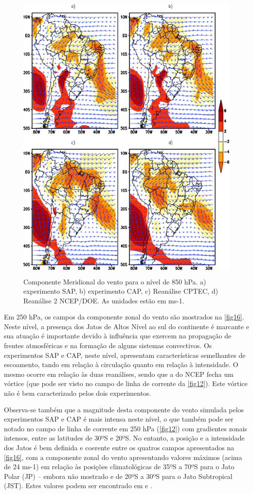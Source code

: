 \begin{figure}[!hbp]
\centering
\includegraphics[height=15cm]{./figs/media_vento-meridional_anl_850hPa.png}
\caption{Componente Meridional do vento para o nível de 850 hPa. a) experimento SAP, b) experimento CAP, c) Reanálise CPTEC, d) Reanálise 2 NCEP/DOE. As unidades estão em ms-1.}
\label{fig15}
\end{figure}

Em 250 hPa, os campos da componente zonal do vento são mostrados na \autoref{fig16}. Neste nível, a presença dos Jatos de Altos Nível ao sul do continente é marcante e sua atuação é importante devido à influência que exercem na propagação de frentes atmosféricas e na formação de alguns sistemas convectivos. Os experimentos SAP e CAP, neste nível, apresentam características semelhantes de escoamento, tando em relação à circulação quanto em relação à intensidade. O mesmo ocorre em relação às duas reanálises, sendo que a do NCEP fecha um vórtice (que pode ser visto no campo de linha de corrente da \autoref{fig12}). Este vórtice não é bem caracterizado pelos dois experimentos. 

Observa-se também que a magnitude desta componente do vento simulada pelos experimentos SAP e CAP é mais intensa neste nível, o que também pode ser notado no campo de linha de corrente em 250 hPa (\autoref{fig12}) com gradientes zonais intensos, entre as latitudes de 30ºS e 20ºS. No entanto, a posição e a intensidade dos Jatos é bem definida e coerente entre os quatros campos apresentados na \autoref{fig16}, com a componente zonal do vento apresentando valores máximos (acima de 24 ms-1) em relação às posições climatológicas de 35ºS a 70ºS para o Jato Polar (JP) – embora não mostrado e de 20ºS a 30ºS para o Jato Subtropical (JST). Estes valores podem ser encontrado em  e . 

